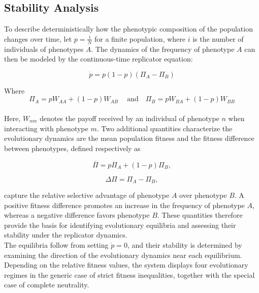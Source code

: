 \subsection{Stability Analysis}
\label{sec:SA}
To describe deterministically how the phenotypic composition of the population changes over time, let \(p = \frac{i}{N}\) for a finite population, where \(i\) is the number of individuals of phenotypes \(A\). The dynamics of the frequency of phenotype \(A\) can then be modeled by the continuous-time replicator equation:

\begin{equation}
    \dot{p} = p(1-p)(\Pi_A - \Pi_B)
    \label{eq:p}
\end{equation}


Where 
\begin{equation}
    \Pi_A = p W_{AA} + (1-p) W_{AB}\ \quad  \text{and} \quad \Pi_B = p W_{BA} + (1-p) W_{BB}
    \label{eq:piA}
\end{equation}
\\

Here, \(W_{nm}\) denotes the payoff received by an individual of phenotype \(n\) when interacting with phenotype \(m\). Two additional quantities characterize the evolutionary dynamics are the mean population fitness and the fitness difference between phenotypes, defined respectively as

\begin{equation}
    \overline{\Pi}=p\Pi_A+(1-p)\Pi_B,
    \label{eq:meanPi}
\end{equation}

\begin{equation}
\Delta\Pi=\Pi_A-\Pi_B,
\label{eq:diffPi}
\end{equation}

capture the relative selective advantage of phenotype \(A\) over phenotype \(B\). A positive fitness difference promotes an increase in the frequency of phenotype \(A\), whereas a negative difference favors phenotype \(B\). These quantities therefore provide the basis for identifying evolutionary equilibria and assessing their stability under the replicator dynamics. \\

The equilibria follow from setting \(\dot{p}=0\), and their stability is determined by examining the direction of the evolutionary dynamics near each equilibrium. Depending on the relative fitness values, the system displays four evolutionary regimes in the generic case of strict fitness inequalities, together with the special case of complete neutrality.\\ 

